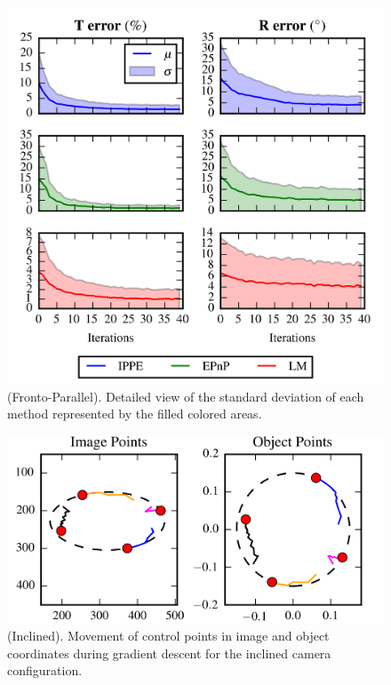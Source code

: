 \documentclass[letterpaper, 10 pt, conference]{ieeeconf}  %
\begin{document}
	\begin{figure}[t]
		\begin{center}
			\includegraphics[width=\columnwidth]{img/pose_separate_fronto_parallel.png}
			\caption{\label{fig:FP_pnp_results_detailed}\small(Fronto-Parallel). Detailed view of the standard deviation of each method represented by the filled colored areas.}
		\end{center}
		\vspace{-0.5cm}
	\end{figure}
	
	\begin{figure}[t]
		\begin{center}
			\includegraphics[width=\columnwidth]{img/image_control_points_inclined.png}
			\caption{\label{fig:IN_points} \small (Inclined). Movement of control points in image and object coordinates during gradient descent for the inclined camera configuration.}
		\end{center}
		\vspace{-0.5cm}
	\end{figure}
	
\end{document}
